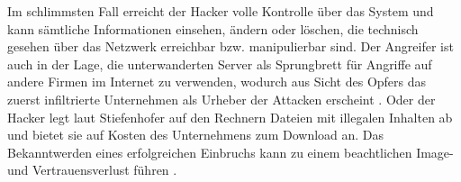 Im schlimmsten Fall erreicht der Hacker volle Kontrolle über das System und kann sämtliche Informationen einsehen, ändern oder löschen, die technisch gesehen über das Netzwerk erreichbar bzw. manipulierbar sind. Der Angreifer ist \zB{} auch in der Lage, die unterwanderten Server als Sprungbrett für Angriffe auf andere Firmen im Internet zu verwenden, wodurch aus Sicht des Opfers das zuerst infiltrierte Unternehmen als Urheber der Attacken erscheint \cite[S.~364--365]{Sta01}. Oder der Hacker legt laut Stiefenhofer auf den Rechnern Dateien mit illegalen Inhalten ab und bietet sie auf Kosten des Unternehmens zum Download an. Das Bekanntwerden eines erfolgreichen Einbruchs kann zu einem beachtlichen Image- und Vertrauensverlust führen \cite[S.~38]{ScO97}. 


 






